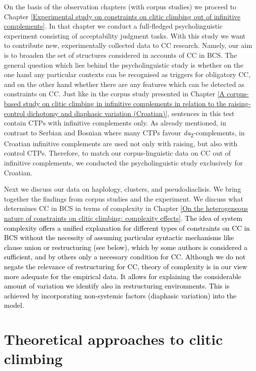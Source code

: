 On the basis of the observation chapters (with corpus studies) we proceed to Chapter \ref{Experimental study on constraints on clitic climbing out of infinitive complements}. In that chapter we conduct a full-fledged psycholinguistic experiment consisting of acceptability judgment tasks. With this study we want to contribute new, experimentally collected data to CC research. Namely, our aim is to broaden the set of structures considered in accounts of CC in BCS. The general question which lies behind the psycholinguistic study is whether on the one hand any particular contexts can be recognised as triggers for obligatory CC, and on the other hand whether there are any features which can be detected as constraints on CC. Just like in the corpus study presented in Chapter \ref{A corpus-based study on clitic climbing in infinitive complements in relation to the raising-control dichotomy and diaphasic variation (Croatian)}, sentences in this test contain CTPs with infinitive complements only. As already mentioned, in contrast to Serbian and Bosnian where many CTPs favour \textit{da}\textsubscript{2}-complements, in Croatian infinitive complements are used not only with raising, but also with control CTPs. Therefore, to match our corpus-linguistic data on CC out of infinitive complements, we conducted the psycholinguistic study exclusively for Croatian. 

Next we discuss our data on haplology, clusters, and pseudodiaclisis. We bring together the findings from corpus studies and the experiment. We discuss what determines CC in BCS in terms of complexity in Chapter \ref{On the heterogeneous nature of constraints on clitic climbing: complexity effects}. \textcolor{black}{The idea of system complexity offers a unified explanation for different types of constraints on CC in BCS without the necessity of assuming particular syntactic mechanisms like clause union or restructuring (see below), which by some authors is considered a sufficient, and by others only a necessary condition for CC. Although we do not negate the relevance of restructuring for CC, theory of complexity is in our view more adequate for the empirical data. It allows for explaining the considerable amount of variation we identify also in restructuring environments. This is achieved by incorporating non-systemic factors (diaphasic variation) into the model.}

\section{Theoretical approaches to clitic climbing}
